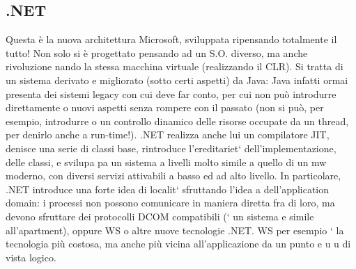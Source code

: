 \documentclass[a4paper,12pt]{article}
\begin{document}
\subsection{.NET}
Questa è la nuova architettura Microsoft, sviluppata ripensando totalmente il tutto! Non solo si è progettato pensando
ad un S.O. diverso, ma anche rivoluzione 
nando la stessa macchina virtuale (realizzando il CLR). Si tratta di un sistema
derivato e migliorato (sotto certi aspetti) da Java: Java infatti ormai presenta
dei sistemi legacy con cui deve far conto, per cui non può introdurre direttamente
o
nuovi aspetti senza rompere con il passato (non si può, per esempio, introdurre
o
un controllo dinamico delle risorse occupate da un thread, per denirlo anche a
run-time!). .NET realizza anche lui un compilatore JIT, denisce una serie di
classi base, rintroduce l'ereditariet` dell'implementazione, delle classi, e svilupa
pa un sistema a livelli molto simile a quello di un mw moderno, con diversi
servizi attivabili a basso ed ad alto livello.
In particolare, .NET introduce una forte idea di localit` sfruttando l'idea
a
dell'application domain: i processi non possono comunicare in maniera diretta
fra di loro, ma devono sfruttare dei protocolli DCOM compatibili (` un sistema
e
simile all'apartment), oppure WS o altre nuove tecnologie .NET. WS per esempio ` la tecnologia più costosa, ma anche più
vicina all'applicazione da un punto
e
u
u
di vista logico.
\end{document}

